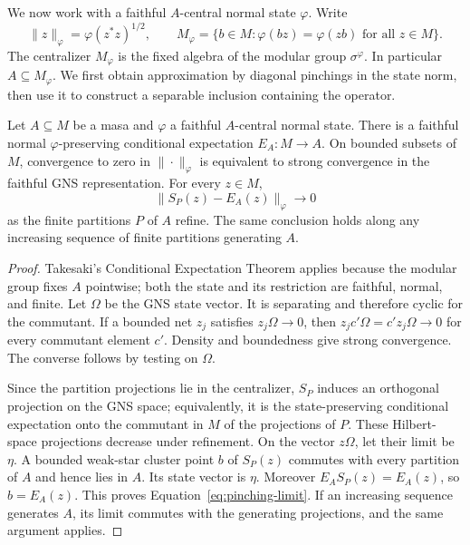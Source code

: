 We now work with a faithful $A$-central normal state $\varphi$.
Write
\[
 \|z\|_\varphi=\varphi(z^*z)^{1/2},
 \qquad
 M_\varphi=\{b\in M:\varphi(bz)=\varphi(zb)\text{ for all }z\in M\}.
\]
The centralizer $M_\varphi$ is the fixed algebra of the modular group
$\sigma^\varphi$.  In particular $A\subseteq M_\varphi$.
We first obtain approximation by diagonal pinchings in the state norm,
then use it to construct a separable inclusion containing the operator.

\begin{lemma}\label{lem:pinching}
Let $A\subseteq M$ be a masa and $\varphi$ a faithful $A$-central normal
state.  There is a faithful normal $\varphi$-preserving conditional
expectation $E_A\colon M\to A$.  On bounded subsets of $M$, convergence
to zero in $\|\cdot\|_\varphi$ is equivalent to strong convergence in the
faithful GNS representation.  For every $z\in M$,
\begin{equation}\label{eq:pinching-limit}
 \|S_P(z)-E_A(z)\|_\varphi\longrightarrow0
\end{equation}
as the finite partitions $P$ of $A$ refine.  The same conclusion holds
along any increasing sequence of finite partitions generating $A$.
\end{lemma}

\begin{proof}
Takesaki's Conditional Expectation Theorem \cite{Tak72} applies because
the modular group fixes $A$ pointwise; both the state and its restriction
are faithful, normal, and finite.  Let $\Omega$ be the GNS state vector.
It is separating and therefore cyclic for the commutant.  If a bounded
net $z_j$ satisfies $z_j\Omega\to0$, then
$z_jc'\Omega=c'z_j\Omega\to0$ for every commutant element $c'$.
Density and boundedness give strong convergence.  The converse follows
by testing on $\Omega$.

Since the partition projections lie in the centralizer, $S_P$ induces
an orthogonal projection on the GNS space; equivalently, it is the
state-preserving conditional expectation onto the commutant in $M$ of
the projections of $P$.  These Hilbert-space projections decrease under
refinement.  On the vector $z\Omega$, let their limit be $\eta$.
A bounded weak-star cluster point $b$ of $S_P(z)$ commutes with every
partition of $A$ and hence lies in $A$.  Its state vector is $\eta$.
Moreover $E_A S_P(z)=E_A(z)$, so $b=E_A(z)$.  This proves
Equation~\eqref{eq:pinching-limit}.  If an increasing sequence generates
$A$, its limit commutes with the generating projections, and the same
argument applies.
\end{proof}

